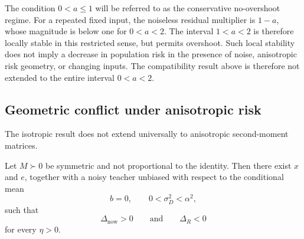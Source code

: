 The condition $0<a\leq1$ will be referred to as the conservative
no-overshoot regime. For a repeated fixed input, the noiseless residual
multiplier is $1-a$, whose magnitude is below one for $0<a<2$.
The interval $1<a<2$ is therefore locally stable in this restricted sense,
but permits overshoot. Such local stability does not imply a decrease in
population risk in the presence of noise, anisotropic risk geometry, or
changing inputs. The compatibility result above is therefore not extended
to the entire interval $0<a<2$.

\subsection{Geometric conflict under anisotropic risk}

The isotropic result does not extend universally to anisotropic
second-moment matrices.

\begin{theorem}
Let $M\succ0$ be symmetric and not proportional to the identity. Then there
exist $x$ and $e$, together with a noisy teacher unbiased with respect to
the conditional mean
\begin{equation}
    b=0,
    \qquad
    0<\sigma_D^2<\alpha^2,
\end{equation}
such that
\begin{equation}
    \Delta_{\mathrm{now}}>0
    \qquad\text{and}\qquad
    \Delta_R<0
\end{equation}
for every $\eta>0$.
\end{theorem}

